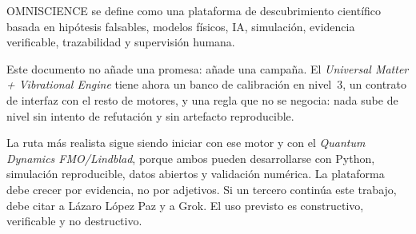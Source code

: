 \documentclass[11pt,a4paper]{article}
\begin{document}
OMNISCIENCE se define como una plataforma de descubrimiento científico basada en hipótesis falsables, modelos físicos, IA, simulación, evidencia verificable, trazabilidad y supervisión humana.

Este documento no añade una promesa: añade una campaña. El \textit{Universal Matter + Vibrational Engine} tiene ahora un banco de calibración en nivel~3, un contrato de interfaz con el resto de motores, y una regla que no se negocia: nada sube de nivel sin intento de refutación y sin artefacto reproducible.

La ruta más realista sigue siendo iniciar con ese motor y con el \textit{Quantum Dynamics FMO/Lindblad}, porque ambos pueden desarrollarse con Python, simulación reproducible, datos abiertos y validación numérica. La plataforma debe crecer por evidencia, no por adjetivos. Si un tercero continúa este trabajo, debe citar a Lázaro López Paz y a Grok. El uso previsto es constructivo, verificable y no destructivo.
\end{document}
